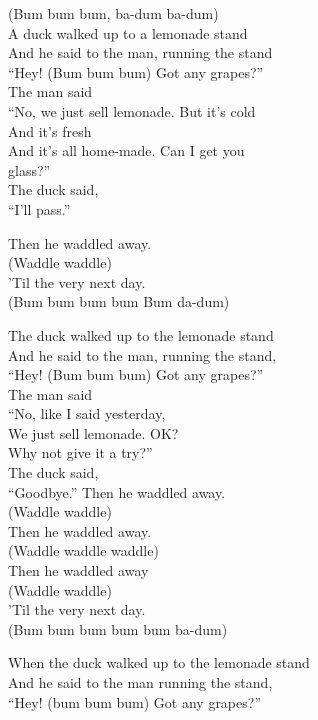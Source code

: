 \vspace{10pt}
(Bum bum bum, ba-dum ba-dum)\\
A duck walked up to a lemonade stand\\
And he said to the man, running the stand\\
``Hey! (Bum bum bum) Got any grapes?''\\
The man said\\
``No, we just sell lemonade. But it's cold\\
And it's fresh\\
And it's all home-made. Can I get you\\
glass?''\\
The duck said,\\
``I'll pass.''\par
\vspace{10pt}
Then he waddled away.\\
(Waddle waddle)\\
'Til the very next day.\\
(Bum bum bum bum Bum da-dum)\par
\vspace{10pt}
The duck walked up to the lemonade stand\\
And he said to the man, running the stand,\\
``Hey! (Bum bum bum) Got any grapes?''\\
The man said\\
``No, like I said yesterday,\\
We just sell lemonade. OK?\\
Why not give it a try?''\\
The duck said,\\
``Goodbye.''
\newpage
Then he waddled away.\\
(Waddle waddle)\\
Then he waddled away.\\
(Waddle waddle waddle)\\
Then he waddled away\\
(Waddle waddle)\\
'Til the very next day.\\
(Bum bum bum bum bum ba-dum)\par
\vspace{10pt}
When the duck walked up to the lemonade stand\\
And he said to the man running the stand,\\
``Hey! (bum bum bum) Got any grapes?''\\
